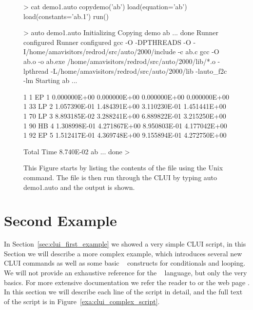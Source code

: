 \begin{figure}[htb]
{\small \begin{center} \begin{boxedverbatim}
> cat demo1.auto
copydemo('ab')
load(equation='ab')
load(constants='ab.1')
run()

> auto demo1.auto 
Initializing
Copying demo ab ... done
Runner configured
Runner configured
gcc -O -DPTHREADS -O -I/home/amavisitors/redrod/src/auto/2000/include -c ab.c
gcc -O ab.o -o ab.exe /home/amavisitors/redrod/src/auto/2000/lib/*.o  -lpthread 
-L/home/amavisitors/redrod/src/auto/2000/lib -lauto_f2c -lm
Starting ab ...
 
   1     1  EP   1  0.000000E+00  0.000000E+00  0.000000E+00  0.000000E+00
   1    33  LP   2  1.057390E-01  1.484391E+00  3.110230E-01  1.451441E+00
   1    70  LP   3  8.893185E-02  3.288241E+00  6.889822E-01  3.215250E+00
   1    90  HB   4  1.308998E-01  4.271867E+00  8.950803E-01  4.177042E+00
   1    92  EP   5  1.512417E-01  4.369748E+00  9.155894E-01  4.272750E+00

 Total Time    8.740E-02
ab ... done
> 
\end{boxedverbatim}
\end{center} 
}
\caption[Figure of running a simple \AUTOc CLUI script.]
{This Figure starts by listing the contents
of the  file using the Unix
 command.  The file is then run through
the \AUTOc CLUI by typing {auto demo1.auto} 
and the output is shown.}
\label{exa:clui_run_first_script}
\end{figure}


\section{ Second Example } \label{sec:clui_complex_example}

In Section~\ref{sec:clui_first_example} we showed a very simple
\AUTOc CLUI script, in this Section we will describe a more
complex example, which introduces several new \AUTOc CLUI
commands as well as some basic \python~ constructs for conditionals
and looping.  We will not provide an exhaustive reference for
the \python~ language, but only 
the very basics.  For more extensive documentation we refer the
reader to  \citeyear{Lut:96} or the
web page .
In this section we will describe each line of the script
in detail, and the full text of the script is in
Figure~\ref{exa:clui_complex_script}.

